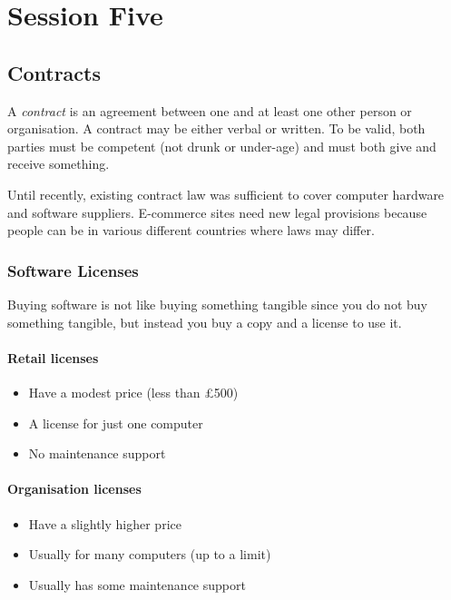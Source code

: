 \section{Session Five}\label{sec:fpse_session_five}

\subsection{Contracts}\label{sub:contracts}

A \emph{contract} is an agreement between one and at least one other person or organisation.
A contract may be either verbal or written.
To be valid, both parties must be competent (not drunk or under-age) and must both give and receive something.

Until recently, existing contract law was sufficient to cover computer hardware and software suppliers.
E-commerce sites need new legal provisions because people can be in various different countries where laws may differ.

\subsubsection{Software Licenses}\label{ssub:software_licenses}

Buying software is not like buying something tangible since you do not buy something tangible, but instead you buy a copy and a license to use it.

\paragraph{Retail licenses}\label{par:retail_licenses}

\begin{itemize}
    \item Have a modest price (less than £500)
    \item A license for just one computer
    \item No maintenance support
\end{itemize}

\paragraph{Organisation licenses}\label{par:organisation_licenses}

\begin{itemize}
    \item Have a slightly higher price
    \item Usually for many computers (up to a limit)
    \item Usually has some maintenance support
\end{itemize}

